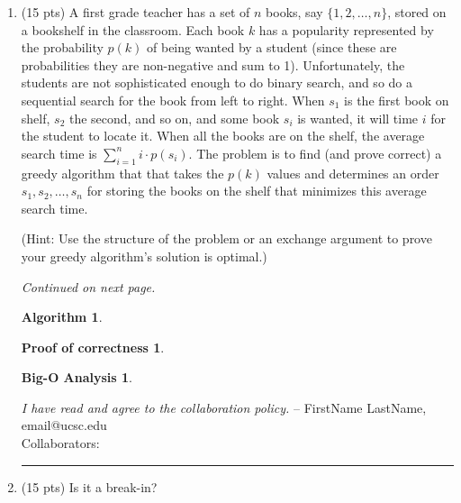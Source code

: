\documentclass[11pt]{article}
\theoremstyle{definition}
\newtheorem*{solution}{Solution}
\newtheorem*{algo}{Algorithm}
\newtheorem*{proofcorr}{Proof of correctness}
\newtheorem*{analysis}{Big-O Analysis}
\begin{document}
\begin{enumerate}
\begin{enumerate}
\begin{solution}
	\end{solution}
	\newpage
\end{enumerate}
\emph{I have read and agree to the collaboration policy.}  -- FirstName LastName, email@ucsc.edu
\\
Collaborators: %
\\
\hrule
\item (15 pts) A first grade teacher has a set of $n$ books, say $\{1, 2, \ldots, n\}$, stored on a bookshelf in the classroom.
Each book $k$ has a popularity represented by the probability $p(k)$ of being wanted by a student (since these are probabilities they are non-negative and sum to 1). 
Unfortunately, the students are not sophisticated enough to do binary search, and so do a sequential search 
for the book from left to right.   When $s_1$ is the first book on shelf, $s_2$ the second, and so on, 
and some book $s_i$ is wanted, it will time $i$ for the student to locate it. 
When all the books are on the shelf, the average search time is $\sum_{i=1}^n i \cdot p(s_i)$.  
The problem is to find (and prove correct) a greedy algorithm that that takes the $p(k)$ values and 
determines an order $s_1, s_2, \ldots , s_n$ for storing the books on the shelf that minimizes this average search time.

(Hint: Use the structure of the problem or an exchange argument to prove your greedy algorithm's solution is optimal.)

\textit{Continued on next page.}
\newpage
\begin{algo}


\end{algo}
\newpage
\begin{proofcorr}

\end{proofcorr}
\newpage
\begin{analysis}

\end{analysis}
\newpage

\emph{I have read and agree to the collaboration policy.}  -- FirstName LastName, email@ucsc.edu
\\
Collaborators: %
\\
\hrule
\item (15 pts)  Is it a break-in?


\end{enumerate}
\end{document}
